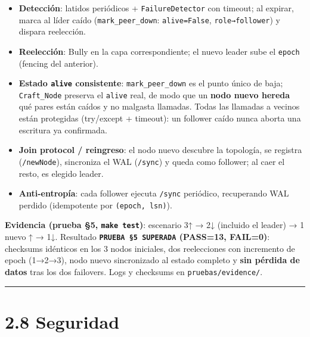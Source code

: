 \documentclass[11pt]{article}
\begin{document}
\begin{itemize}
\item \textbf{Detección}: latidos periódicos + \texttt{FailureDetector} con timeout; al expirar, marca al líder caído (\texttt{mark\_\allowbreak{}peer\_\allowbreak{}down}: \texttt{alive=False}, \texttt{role→follower}) y dispara reelección.
\item \textbf{Reelección}: Bully en la capa correspondiente; el nuevo leader sube el \texttt{epoch} (fencing del anterior).
\item \textbf{Estado \texttt{alive} consistente}: \texttt{mark\_\allowbreak{}peer\_\allowbreak{}down} es el punto único de baja; \texttt{Craft\_\allowbreak{}Node} preserva el \texttt{alive} real, de modo que un \textbf{nodo nuevo hereda} qué pares están caídos y no malgasta llamadas. Todas las llamadas a vecinos están protegidas (try/except + timeout): un follower caído nunca aborta una escritura ya confirmada.
\item \textbf{Join protocol / reingreso}: el nodo nuevo descubre la topología, se registra (\texttt{/\allowbreak{}newNode}), sincroniza el WAL (\texttt{/\allowbreak{}sync}) y queda como follower; al caer el resto, es elegido leader.
\item \textbf{Anti-entropía}: cada follower ejecuta \texttt{/\allowbreak{}sync} periódico, recuperando WAL perdido (idempotente por \texttt{(epoch, lsn)}).
\end{itemize}

\textbf{Evidencia (prueba §5, \texttt{make test})}: escenario 3↑ → 2↓ (incluido el leader) → 1 nuevo ↑ → 1↓. Resultado \textbf{\texttt{PRUEBA §5 SUPERADA} (PASS=13, FAIL=0)}: checksums idénticos en los 3 nodos iniciales, dos reelecciones con incremento de epoch (1→2→3), nodo nuevo sincronizado al estado completo y \textbf{sin pérdida de datos} tras los dos failovers. Logs y checksums en \texttt{pruebas/\allowbreak{}evidence/\allowbreak{}}.

\vspace{2pt}\noindent\rule{\textwidth}{0.4pt}\vspace{2pt}

\section{2.8 Seguridad}
\end{document}
